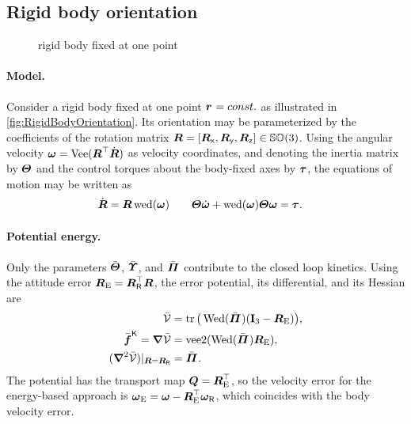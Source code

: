 \subsection{Rigid body orientation}\label{sec:CtrlExampleRigidBodyOrientation}
\begin{figure}[ht]
 \centering
 
 \caption{rigid body fixed at one point}
 \label{fig:RigidBodyOrientation}
\end{figure}

\paragraph{Model.}
Consider a rigid body fixed at one point $\bodyPos{}{} = \const$ as illustrated in \autoref{fig:RigidBodyOrientation}.
Its orientation may be parameterized by the coefficients of the rotation matrix $\boldsymbol{R} = [\boldsymbol{R}_{\mathsf{x}},\boldsymbol{R}_{\mathsf{y}},\boldsymbol{R}_{\mathsf{z}}] \in \mathbb{SO}(3)$.
Using the angular velocity $\boldsymbol{\omega} = \operatorname{Vee}(\boldsymbol{R}^\top\dot{\boldsymbol{R}})$ as velocity coordinates, and denoting the inertia matrix by $\boldsymbol{\varTheta}$ and the control torques about the body-fixed axes by $\boldsymbol{\tau}$, the equations of motion may be written as
\begin{align}
 \dot{\boldsymbol{R}} = \boldsymbol{R} \operatorname{wed}(\boldsymbol{\omega})
\qquad
 \boldsymbol{\varTheta}\dot{\boldsymbol{\omega}} + \operatorname{wed}(\boldsymbol{\omega}) \boldsymbol{\varTheta} \boldsymbol{\omega} &= \boldsymbol{\tau}.
\end{align}

\paragraph{Potential energy.}
Only the parameters $\bar{\boldsymbol{\varTheta}}$, $\bar{\boldsymbol{\varUpsilon}}$, and $\bodyMOSC{}{}$ contribute to the closed loop kinetics.
Using the attitude error $\boldsymbol{R}_{\mathrm{E}} = \boldsymbol{R}_{\mathsf{R}}^\top \boldsymbol{R}$, the error potential, its differential, and its Hessian are
\begin{subequations}
\begin{align}
 \potentialEnergyC &= \tr\big( \wedMatOp(\bodyMOSC{}{}) (\idMat[3] - \RE) \big),
\\
 \genForceStiffC = \differential \potentialEnergyC &= \veeTwoOp(\wedMatOp(\bodyMOSC{}{}) \RE),
\\
 (\differential^2 \potentialEnergyC)|_{\R=\RR} &= \bodyMOSC{}{}.
\end{align} 
\end{subequations}
The potential has the transport map $\boldsymbol{Q} = \boldsymbol{R}_{\mathrm{E}}^\top$, so the velocity error for the energy-based approach is $\boldsymbol{\omega}_{\mathrm{E}} = \boldsymbol{\omega} - \boldsymbol{R}_{\mathrm{E}}^\top \boldsymbol{\omega}_{\mathsf{R}}$, which coincides with the body velocity error.

